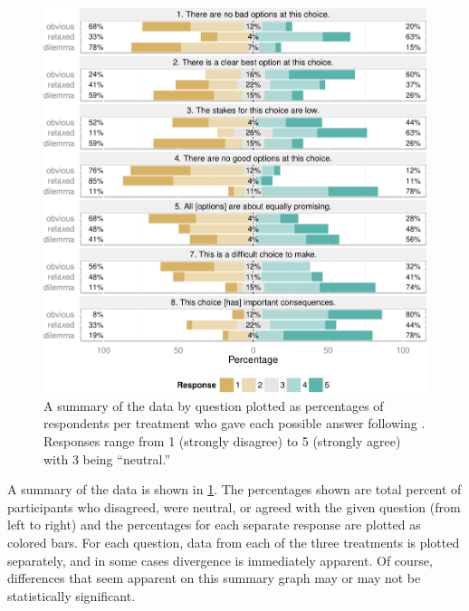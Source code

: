 \begin{figure}[hp!]
  \centering
  \includegraphics[width=\textwidth]{fig/combined-report-cropped.pdf}
  \caption{A summary of the data by question plotted as percentages of respondents per treatment who gave each possible answer following \citep{Robbins2011}. Responses range from 1 (strongly disagree) to 5 (strongly agree) with 3 being ``neutral.''}
  \label{fig:report}
\end{figure}


A summary of the data is shown in \cref{fig:report}.
%
The percentages shown are total percent of participants who disagreed, were neutral, or agreed with the given question (from left to right) and the percentages for each separate response are plotted as colored bars.
%
For each question, data from each of the three treatments is plotted separately, and in some cases divergence is immediately apparent.
%
Of course, differences that seem apparent on this summary graph may or may not be statistically significant.


